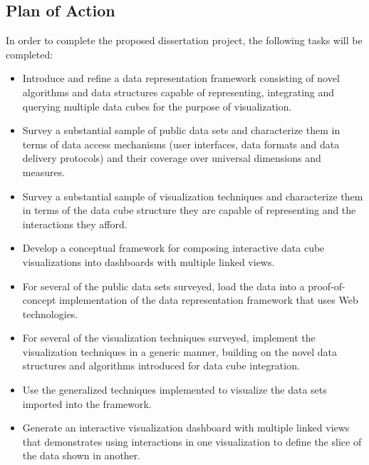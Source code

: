 \documentclass[12pt]{article}
\begin{document}
\begin{doublespace}
\section{Plan of Action}
In order to complete the proposed dissertation project, the following tasks will be completed:
\begin{itemize}
\item Introduce and refine a data representation framework consisting of novel algorithms and data structures capable of representing, integrating and querying multiple data cubes for the purpose of visualization.
\item Survey a substantial sample of public data sets and characterize them in terms of data access mechanisms (user interfaces, data formats and data delivery protocols) and their coverage over universal dimensions and measures.
\item Survey a substantial sample of visualization techniques and characterize them in terms of the data cube structure they are capable of representing and the interactions they afford.
\item Develop a conceptual framework for composing interactive data cube visualizations into dashboards with multiple linked views.
\item For several of the public data sets surveyed, load the data into a proof-of-concept implementation of the data representation framework that uses Web technologies.
\item For several of the visualization techniques surveyed, implement the visualization techniques in a generic manner, building on the novel data structures and algorithms introduced for data cube integration.
\item Use the generalized techniques implemented to visualize the data sets imported into the framework.
\item Generate an interactive visualization dashboard with multiple linked views that demonstrates using interactions in one visualization to define the slice of the data shown in another.
\end{itemize}
\pagebreak

\end{doublespace}
\end{document}
